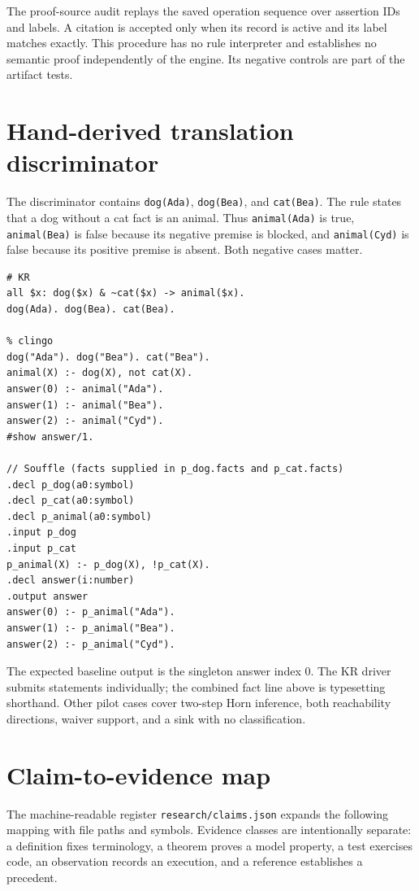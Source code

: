 The proof-source audit replays the saved operation sequence over assertion IDs
and labels. A citation is accepted only when its record is active and its label
matches exactly. This procedure has no rule interpreter and establishes no
semantic proof independently of the engine. Its negative controls are part of
the artifact tests.

\section{Hand-derived translation discriminator}
\label{app:translation}

The discriminator contains \texttt{dog(Ada)}, \texttt{dog(Bea)}, and
\texttt{cat(Bea)}. The rule states that a dog without a cat fact is an animal.
Thus \texttt{animal(Ada)} is true, \texttt{animal(Bea)} is false because its
negative premise is blocked, and \texttt{animal(Cyd)} is false because its
positive premise is absent. Both negative cases matter.

\begin{lstlisting}[style=kr]
# KR
all $x: dog($x) & ~cat($x) -> animal($x).
dog(Ada). dog(Bea). cat(Bea).

% clingo
dog("Ada"). dog("Bea"). cat("Bea").
animal(X) :- dog(X), not cat(X).
answer(0) :- animal("Ada").
answer(1) :- animal("Bea").
answer(2) :- animal("Cyd").
#show answer/1.

// Souffle (facts supplied in p_dog.facts and p_cat.facts)
.decl p_dog(a0:symbol)
.decl p_cat(a0:symbol)
.decl p_animal(a0:symbol)
.input p_dog
.input p_cat
p_animal(X) :- p_dog(X), !p_cat(X).
.decl answer(i:number)
.output answer
answer(0) :- p_animal("Ada").
answer(1) :- p_animal("Bea").
answer(2) :- p_animal("Cyd").
\end{lstlisting}
The expected baseline output is the singleton answer index 0. The KR driver
submits statements individually; the combined fact line above is typesetting
shorthand. Other pilot cases cover two-step Horn inference, both reachability
directions, waiver support, and a sink with no classification.

\section{Claim-to-evidence map}
\label{app:claims}

The machine-readable register \texttt{research/claims.json} expands the following
mapping with file paths and symbols. Evidence classes are intentionally
separate: a definition fixes terminology, a theorem proves a model property, a
test exercises code, an observation records an execution, and a reference
establishes a precedent.

